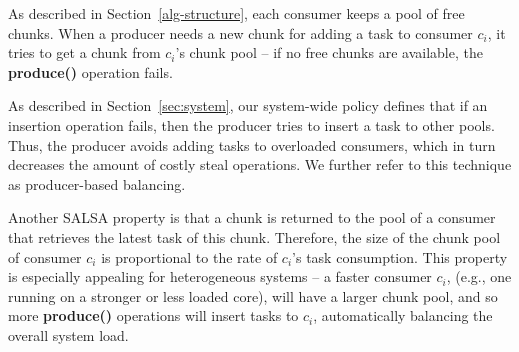 As described in Section~\ref{alg-structure}, each consumer keeps a pool of free chunks.
When a producer needs a new chunk for adding a task to consumer $c_i$, it tries to get a chunk from $c_i$'s chunk pool -- if no free chunks are available, the {\bf produce()} operation fails.

As described in Section~\ref{sec:system}, our system-wide policy defines that if an insertion operation fails, then the producer tries to insert a task to other pools. Thus, the producer avoids adding tasks to overloaded consumers, which in turn decreases the amount of costly steal operations. We further refer to this technique as producer-based balancing. 

Another SALSA property is that a chunk is returned to the pool of a consumer that retrieves the latest task of this chunk. 
Therefore, the size of the chunk pool of consumer $c_i$ is proportional to the rate of $c_i$'s task consumption.
This property is especially appealing for heterogeneous systems -- a faster consumer $c_i$, (e.g., one running on a stronger or less loaded core), will have a larger chunk pool, and so more {\bf produce()} operations will insert tasks to $c_i$, automatically balancing the overall system load. 
